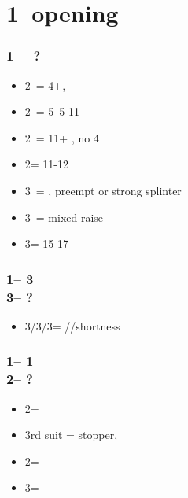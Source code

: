 \documentclass[12pt, a4paper]{report}
\begin{document}
{{        \section*{\colorbox{blue!30}{1\diams\ opening}}
         {

            \subsubsection*{1\diams\ -- ?}
            \begin{itemize}
                \item 2\diams\ = 4+\diams, \invp
                \item 2\hearts\ = 5\hearts\ 5-11
                \item 2\spades\ = 11+ \bal, no 4\major
                \item 2\nt = 11-12 \bal
                \item 3\clubs\ = \diams, preempt or strong splinter
                \item 3\diams\ = mixed raise
                \item 3\nt = 15-17 \bal
            \end{itemize}

            \subsubsection*{1\diams -- 3\clubs\\
                            3\diams -- ?}
            \begin{itemize}
                \item 3\hearts/3\spades/3\nt = \hearts/\spades/\clubs shortness
            \end{itemize}

            \subsubsection*{1\diams -- 1\major\\
                            2\diams -- ?}
            \begin{itemize}
                \item 2\major = \nf
                \item 3rd suit = stopper, \gf
                \item 2\nt = \gf
                \item 3\diams = \inv
            \end{itemize}

}}}
\end{document}
